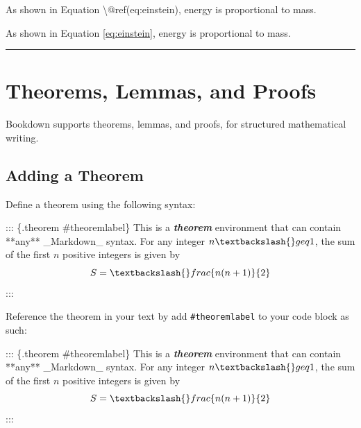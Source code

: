 \documentclass[
]{book}
\newenvironment{Shaded}{\begin{snugshade}}{\end{snugshade}}
\newcommand{\InformationTok}[1]{\textcolor[rgb]{0.56,0.35,0.01}{\textbf{\textit{#1}}}}
\newcommand{\NormalTok}[1]{#1}
\theoremstyle{definition}
\theoremstyle{definition}
\theoremstyle{definition}
\theoremstyle{definition}
\theoremstyle{remark}
\begin{document}
\begin{Shaded}
\begin{Highlighting}[]
\NormalTok{As shown in Equation \textbackslash{}@ref(eq:einstein), energy is proportional to mass.}
\end{Highlighting}
\end{Shaded}

As shown in Equation \eqref{eq:einstein}, energy is proportional to mass.

\begin{center}\rule{0.5\linewidth}{0.5pt}\end{center}

\section{Theorems, Lemmas, and Proofs}\label{theorems-lemmas-and-proofs}

Bookdown supports theorems, lemmas, and proofs, for structured mathematical writing.

\subsection{Adding a Theorem}\label{adding-a-theorem}

Define a theorem using the following syntax:

\begin{Shaded}
\begin{Highlighting}[]
\NormalTok{::: \{.theorem \#theoremlabel\}}
\NormalTok{This is a }\InformationTok{\textasciigrave{}theorem\textasciigrave{}}\NormalTok{ environment that can contain **any**}
\NormalTok{\_Markdown\_ syntax.}
\NormalTok{For any integer $n \textbackslash{}geq 1$, the sum of the first $n$ positive integers is given by}
\NormalTok{$$}
\NormalTok{S = \textbackslash{}frac\{n(n + 1)\}\{2\}}
\NormalTok{$$}
\NormalTok{:::}
\end{Highlighting}
\end{Shaded}

Reference the theorem in your text by add \texttt{\#theoremlabel} to your code block as such:

\begin{Shaded}
\begin{Highlighting}[]
\NormalTok{::: \{.theorem \#theoremlabel\}}
\NormalTok{This is a }\InformationTok{\textasciigrave{}theorem\textasciigrave{}}\NormalTok{ environment that can contain **any**}
\NormalTok{\_Markdown\_ syntax.}
\NormalTok{For any integer $n \textbackslash{}geq 1$, the sum of the first $n$ positive integers is given by}
\NormalTok{$$}
\NormalTok{S = \textbackslash{}frac\{n(n + 1)\}\{2\}}
\NormalTok{$$}
\NormalTok{:::}
\end{Highlighting}
\end{Shaded}
\end{document}
